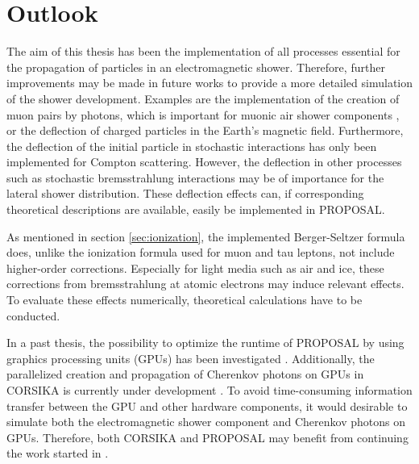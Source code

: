 \section{Outlook}

The aim of this thesis has been the implementation of all processes essential for the propagation of particles in an electromagnetic shower.
Therefore, further improvements may be made in future works to provide a more detailed simulation of the shower development.
Examples are the implementation of the creation of muon pairs by photons, which is important for muonic air shower components \cite{corsika_physics}, or the deflection of charged particles in the Earth's magnetic field.
Furthermore, the deflection of the initial particle in stochastic interactions has only been implemented for Compton scattering.
However, the deflection in other processes such as stochastic bremsstrahlung interactions may be of importance for the lateral shower distribution.
These deflection effects can, if corresponding theoretical descriptions are available, easily be implemented in PROPOSAL.

As mentioned in section \ref{sec:ionization}, the implemented Berger-Seltzer formula does, unlike the ionization formula used for muon and tau leptons, not include higher-order corrections.
Especially for light media such as air and ice, these corrections from bremsstrahlung at atomic electrons may induce relevant effects.
To evaluate these effects numerically, theoretical calculations have to be conducted.

In a past thesis, the possibility to optimize the runtime of PROPOSAL by using graphics processing units (GPUs) has been investigated \cite{tomasz}.
Additionally, the parallelized creation and propagation of Cherenkov photons on GPUs in CORSIKA is currently under development \cite{baack}.
To avoid time-consuming information transfer between the GPU and other hardware components, it would desirable to simulate both the electromagnetic shower component and Cherenkov photons on GPUs.
Therefore, both CORSIKA and PROPOSAL may benefit from continuing the work started in \cite{tomasz}.


